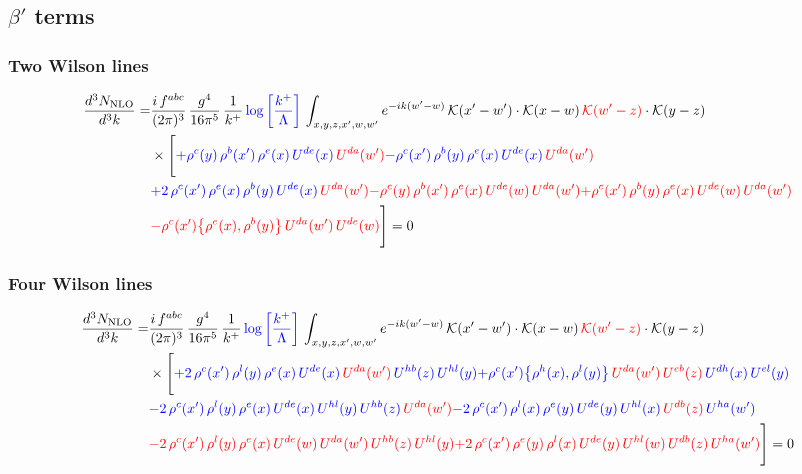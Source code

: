 \documentclass[9pt]{article}
\newcommand{\chg}[1]{{\color{red}#1}}
\numberwithin{equation}{section}
\begin{document}
\subsection{$\beta'$ terms}
\subsubsection{Two Wilson lines}
\begin{align}
    \frac{d^{3}N_{\rm NLO}}{d^{3}k}= & \frac{i\,f^{abc}}{(2\pi)^{3}}\,\frac{g^{4}}{16\pi^{5}}\,\frac{1}{k^{+}}\,{\color{blue}\log{\left[\frac{k^{+}}{\Lambda}\right]}}\,\int_{x,y,z,x',w,w'}e^{-ik(w'-w)}\,\mathcal{K}(x'-w')\cdot\mathcal{K}(x-w)\,\chg{\mathcal{K}(w'-z)}\cdot\mathcal{K}(y-z)\notag \\ & \times\Bigg[{\color{blue}+\rho^{c}(y)\,\rho^{b}(x')\,\rho^{e}(x)\,U^{de}(x)\,{\color{red}U^{da}(w')}}{\color{blue}-\rho^{c}(x')\,\rho^{b}(y)\,\rho^{e}(x)\,U^{de}(x)\,{\color{red}U^{da}(w')}}\notag \\ & {\color{blue}+2\,\rho^{c}(x')\,\rho^{e}(x)\,\rho^{b}(y)\,U^{de}(x)\,{\color{red}U^{da}(w')}}{\color{red}-\rho^{c}(y)\,\rho^{b}(x')\,\rho^{e}(x)\,U^{de}(w)\,{\color{red}U^{da}(w')}}{\color{red}+\rho^{c}(x')\,\rho^{b}(y)\,\rho^{e}(x)\,U^{de}(w)\,{\color{red}U^{da}(w')}}\notag \\ & {\color{red} -\rho^{c}(x')\big\{\rho^{e}(x),\rho^{b}(y)\big\}\,{\color{red}U^{da}(w')}\,U^{de}(w)}\Bigg] = 0 
\end{align}    
\subsubsection{Four Wilson lines}
\begin{align}
    \frac{d^{3}N_{\rm NLO}}{d^{3}k}= & \frac{i\,f^{abc}}{(2\pi)^{3}}\,\frac{g^{4}}{16\pi^{5}}\,\frac{1}{k^{+}}\,{\color{blue}\log{\left[\frac{k^{+}}{\Lambda}\right]}}\,\int_{x,y,z,x',w,w'}e^{-ik(w'-w)}\,\mathcal{K}(x'-w')\cdot\mathcal{K}(x-w)\,\chg{\mathcal{K}(w'-z)}\cdot\mathcal{K}(y-z)\notag \\ & \times\Bigg[{\color{blue}+2\,\rho^{c}(x')\,\rho^{l}(y)\,\rho^{e}(x)\,U^{de}(x)\,{\color{red}U^{da}(w')}\,U^{hb}(z)\,U^{hl}(y)}{\color{blue}+\rho^{c}(x')\big\{\rho^{h}(x),\rho^{l}(y)\big\}\,{\color{red}U^{da}(w')}\,{\color{red}U^{eb}(z)}\,U^{dh}(x)\,U^{el}(y)}\notag \\ & {\color{blue}-2\,\rho^{c}(x')\,\rho^{l}(y)\,\rho^{e}(x)\,U^{de}(x)\,U^{hl}(y)\,U^{hb}(z)\,{\color{red}U^{da}(w')}}{\color{blue}-2\,\rho^{c}(x')\,\rho^{l}(x)\,\rho^{e}(y)\,U^{de}(y)\,U^{hl}(x)\,{\color{red}U^{db}(z)}\,U^{ha}(w')}\notag \\ & {\color{red}-2\,\rho^{c}(x')\,\rho^{l}(y)\,\rho^{e}(x)\,U^{de}(w)\,{\color{red}U^{da}(w')}\,U^{hb}(z)\,U^{hl}(y)}{\color{red}+2\,\rho^{c}(x')\,\rho^{e}(y)\,\rho^{l}(x)\,U^{de}(y)\,U^{hl}(w)\,U^{db}(z)\,U^{ha}(w')}\Bigg] = 0
\end{align}
\end{document}
